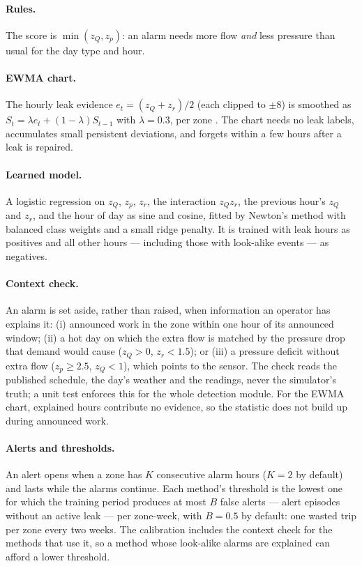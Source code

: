 \documentclass[11pt,a4paper]{article}
\begin{document}
\paragraph{Rules.} The score is $\min(z_Q, z_p)$: an alarm needs more flow \emph{and} less pressure than usual for the day type and hour.

\paragraph{EWMA chart.} The hourly leak evidence $e_t = (z_Q + z_r)/2$ (each clipped to $\pm 8$) is smoothed as $S_t = \lambda e_t + (1-\lambda) S_{t-1}$ with $\lambda = 0.3$, per zone \cite{roberts1959,montgomery2009}. The chart needs no leak labels, accumulates small persistent deviations, and forgets within a few hours after a leak is repaired.

\paragraph{Learned model.} A logistic regression on $z_Q$, $z_p$, $z_r$, the interaction $z_Q z_r$, the previous hour's $z_Q$ and $z_r$, and the hour of day as sine and cosine, fitted by Newton's method with balanced class weights and a small ridge penalty. It is trained with leak hours as positives and all other hours --- including those with look-alike events --- as negatives.

\paragraph{Context check.} An alarm is set aside, rather than raised, when information an operator has explains it: (i) announced work in the zone within one hour of its announced window; (ii) a hot day on which the extra flow is matched by the pressure drop that demand would cause ($z_Q > 0$, $z_r < 1.5$); or (iii) a pressure deficit without extra flow ($z_p \ge 2.5$, $z_Q < 1$), which points to the sensor. The check reads the published schedule, the day's weather and the readings, never the simulator's truth; a unit test enforces this for the whole detection module. For the EWMA chart, explained hours contribute no evidence, so the statistic does not build up during announced work.

\paragraph{Alerts and thresholds.} An alert opens when a zone has $K$ consecutive alarm hours ($K = 2$ by default) and lasts while the alarms continue. Each method's threshold is the lowest one for which the training period produces at most $B$ false alerts --- alert episodes without an active leak --- per zone-week, with $B = 0.5$ by default: one wasted trip per zone every two weeks. The calibration includes the context check for the methods that use it, so a method whose look-alike alarms are explained can afford a lower threshold.
\end{document}
